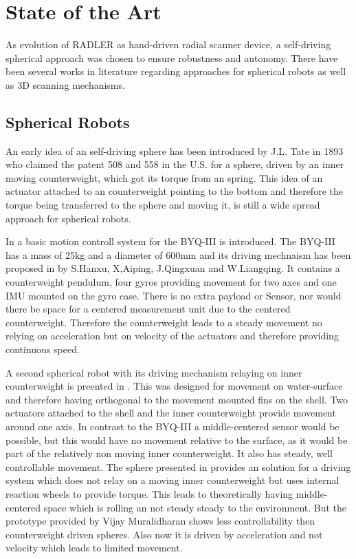 \section{State of the Art}
\label{sec:stateOfTheArt}
As evolution of RADLER as hand-driven radial scanner device, a self-driving spherical approach was chosen to ensure robustness and autonomy.  There have been several works in literature regarding approaches for spherical robots as well as 3D scanning mechanisms. 

\subsection{Spherical Robots}
\label{sec:stateOfTheArt:sphericalrobots}
An early idea of an self-driving sphere has been introduced by J.L. Tate in 1893 who claimed the patent  508 and 558 in  the U.S. for a sphere, driven by an inner moving counterweight, which got its torque from an spring. This idea of an actuator attached to an counterweight pointing to the bottom and therefore the torque being transferred to the sphere and moving it, is still a wide spread approach for spherical robots.

In \cite{soa1} a basic motion controll system for the BYQ-III is introduced. The BYQ-III has a mass of 25kg and a diameter of 600mm and its driving mechnaism has been proposed in \cite{soa2} by S.Hanxu, X,Aiping, J.Qingxuan and W.Liangqing. It contains  a counterweight pendulum, four gyros providing movement for two axes and one IMU mounted on the gyro case. There is no extra payload or Sensor, nor would there be space for a centered measurement unit due to the centered counterweight. Therefore the counterweight leads to a steady movement no relying on acceleration but on velocity of the actuators and therefore providing continuous speed.

A second spherical robot with its driving mechanism relaying on inner counterweight is preented in \cite{soa3}. This was designed for movement on water-surface and therefore having orthogonal to the movement mounted fins on the shell. Two actuators attached to the shell and the inner counterweight provide movement around one axis. In contrast to the BYQ-III a middle-centered  sensor would be possible, but this would have no movement relative to the surface, as it would be part of the relatively non moving inner counterweight. It also has steady, well controllable movement. 
The sphere presented in \cite{soa4} \cite{soa5} provides an solution for a driving system which does not relay on a moving inner counterweight but uses internal reaction wheels to provide torque. This leads to theoretically having middle-centered space which is rolling an not steady steady to the environment.  But the prototype provided by Vijay Muralidharan shows less controllability then counterweight driven spheres. Also now it is driven by acceleration and not velocity which leads to limited movement.

